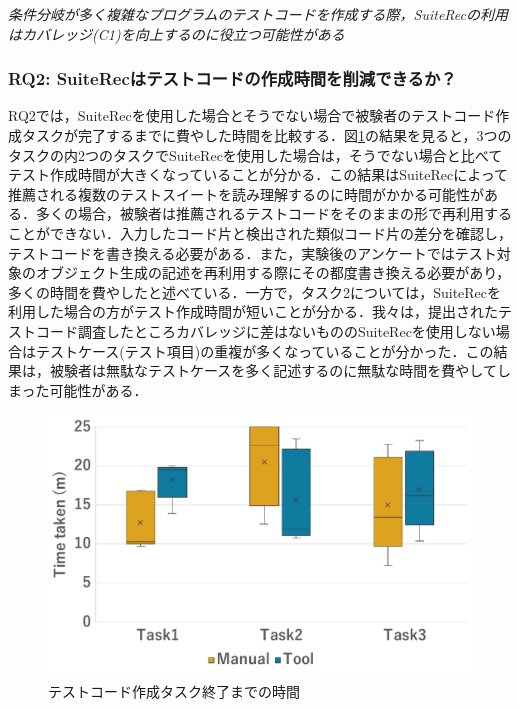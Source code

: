 \documentclass[12pt]{jarticle} %
\begin{document}
\begin{breakbox}
\textit{条件分岐が多く複雑なプログラムのテストコードを作成する際，{\sf SuiteRec}の利用はカバレッジ(C1)を向上するのに役立つ可能性がある}
\end{breakbox}


\subsubsection{RQ2: {\sf SuiteRec}はテストコードの作成時間を削減できるか？}
RQ2では，{\sf SuiteRec}を使用した場合とそうでない場合で被験者のテストコード作成タスクが完了するまでに費やした時間を比較する．図\ref{time}の結果を見ると，3つのタスクの内2つのタスクで{\sf SuiteRec}を使用した場合は，そうでない場合と比べてテスト作成時間が大きくなっていることが分かる．この結果は{\sf SuiteRec}によって推薦される複数のテストスイートを読み理解するのに時間がかかる可能性がある．多くの場合，被験者は推薦されるテストコードをそのままの形で再利用することができない．入力したコード片と検出された類似コード片の差分を確認し，テストコードを書き換える必要がある．また，実験後のアンケートではテスト対象のオブジェクト生成の記述を再利用する際にその都度書き換える必要があり，多くの時間を費やしたと述べている．一方で，タスク2については，{\sf SuiteRec}を利用した場合の方がテスト作成時間が短いことが分かる．我々は，提出されたテストコード調査したところカバレッジに差はないものの{\sf SuiteRec}を使用しない場合はテストケース(テスト項目)の重複が多くなっていることが分かった．この結果は，被験者は無駄なテストケースを多く記述するのに無駄な時間を費やしてしまった可能性がある．

\begin{figure}[htbp]
  \begin{center}
   \includegraphics[width=12cm]{time.pdf}
  \caption{テストコード作成タスク終了までの時間}
  \label{time}
  \end{center}
\end{figure}
\end{document}
